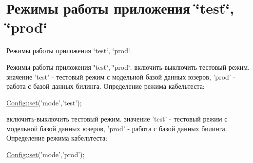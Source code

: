 \hypertarget{group__mode}{\section{Режимы работы приложения \char`\"{}test\char`\"{}, \char`\"{}prod\char`\"{}}
\label{group__mode}
}


Режимы работы приложения \char`\"{}test\char`\"{}, \char`\"{}prod\char`\"{}.  


Режимы работы приложения \char`\"{}test\char`\"{}, \char`\"{}prod\char`\"{}. включить-\/выключить тестовый режим. значение 'test' -\/ тестовый режим с модельной базой данных юзеров, 'prod' -\/ работа с базой данных билинга. Определение режима кабельтеста\-: 
\begin{DoxyCode}
\hyperlink{class_config_aa485369b2925858d92e468d405bd0798}{Config::set}(\textcolor{stringliteral}{'mode'},\textcolor{stringliteral}{'test'});
\end{DoxyCode}


включить-\/выключить тестовый режим. значение 'test' -\/ тестовый режим с модельной базой данных юзеров, 'prod' -\/ работа с базой данных билинга. Определение режима кабельтеста\-: 
\begin{DoxyCode}
\hyperlink{class_config_aa485369b2925858d92e468d405bd0798}{Config::set}(\textcolor{stringliteral}{'mode'},\textcolor{stringliteral}{'prod'});
\end{DoxyCode}
 